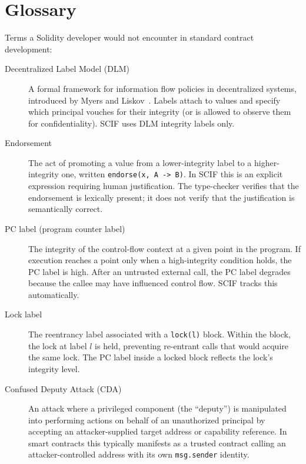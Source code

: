\documentclass[11pt,a4paper]{article}
\begin{document}
\section{Glossary}
\label{sec:glossary}

Terms a Solidity developer would not encounter in standard contract development:

\begin{description}
  \item[Decentralized Label Model (DLM)] A formal framework for information
    flow policies in decentralized systems, introduced by Myers and
    Liskov~\cite{myers1997sosp}. Labels attach to values and specify which
    principal vouches for their integrity (or is allowed to observe them for
    confidentiality). SCIF uses DLM integrity labels only.

  \item[Endorsement] The act of promoting a value from a lower-integrity label
    to a higher-integrity one, written \texttt{endorse(x, A -> B)}. In SCIF
    this is an explicit expression requiring human justification. The
    type-checker verifies that the endorsement is lexically present; it does not
    verify that the justification is semantically correct.

  \item[PC label (program counter label)] The integrity of the control-flow
    context at a given point in the program. If execution reaches a point only
    when a high-integrity condition holds, the PC label is high. After an
    untrusted external call, the PC label degrades because the callee may have
    influenced control flow. SCIF tracks this automatically.

  \item[Lock label] The reentrancy label associated with a \texttt{lock(l)}
    block. Within the block, the lock at label $l$ is held, preventing
    re-entrant calls that would acquire the same lock. The PC label inside a
    locked block reflects the lock's integrity level.

  \item[Confused Deputy Attack (CDA)] An attack where a privileged component
    (the ``deputy'') is manipulated into performing actions on behalf of an
    unauthorized principal by accepting an attacker-supplied target address or
    capability reference. In smart contracts this typically manifests as a
    trusted contract calling an attacker-controlled address with its own
    \texttt{msg.sender} identity.


\end{description}
\end{document}
